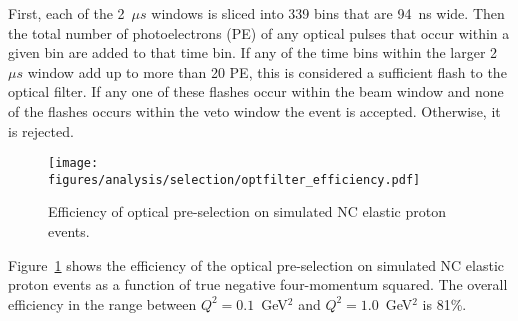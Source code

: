     First, each of the 2~$\mu s$ windows is sliced into 339 bins that are 94~ns
    wide. Then the total number of photoelectrons (PE) of any optical pulses
    that occur within a given bin are added to that time bin. If any of the
    time bins within the larger 2~$\mu s$ window add up to more than 20 PE,
    this is considered a sufficient flash to the optical filter. If any one of
    these flashes occur within the beam window and none of the flashes occurs
    within the veto window the event is accepted. Otherwise, it is rejected.
    \begin{figure}[ht]
      \centering
      \texttt{[image: figures/analysis/selection/optfilter\_efficiency.pdf]}
      \caption{Efficiency of optical pre-selection on simulated NC elastic
        proton events.}
      \label{fig:opfiltereff}
    \end{figure}

    Figure~\ref{fig:opfiltereff} shows the efficiency of the optical
    pre-selection on simulated NC elastic proton events as a function of true
    negative four-momentum squared. The overall efficiency in the range between
    $Q^2 = 0.1$~GeV$^2$ and $Q^2 = 1.0$~GeV$^2$ is 81\%.

